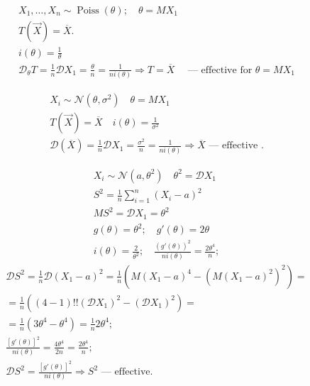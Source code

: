 \begin{example}
    \begin{gather*}
        X_1, \ldots, X_n \sim \operatorname{Poiss}(\theta); \quad 
        \theta = MX_1 \\
        T(\vec{X}) = \overline{X}. \\
        i(\theta) = \frac{1}{\theta} \\
        \mathcal{D}_{\theta} T = \frac{1}{n} \mathcal{D}X_1 =
        \frac{\theta}{n} = \frac{1}{ni(\theta)}
        \Rightarrow T = \overline{X} \quad \text{ --- effective for }
        \theta = MX_1
    \end{gather*}
\end{example}

\begin{example}
    \begin{gather*}
        X_i \sim \mathcal{N}(\theta, \sigma^2) \quad \theta = MX_1 \\
        T(\vec{X}) = \overline{X} \quad i(\theta) = \frac{1}{\sigma^2} \\
        \mathcal{D}(\overline{X}) = \frac{1}{n} \mathcal{D}X_1 = 
        \frac{\sigma^2}{n} = \frac{1}{ni(\theta)} \Rightarrow 
        \overline{X} \text{ --- effective }.
    \end{gather*}
\end{example}

\begin{example}
    \begin{gather*}
        X_i \sim \mathcal{N}(a, \theta^2) \quad \theta^2 = \mathcal{D}X_{1} \\
        S^2 = \frac{1}{n} \sum_{i=1}^{n} \left( X_i - a \right) ^2 \\
        MS^2 = \mathcal{D}X_{1} = \theta^2 \\
        g(\theta) = \theta^2; \quad g'(\theta) = 2 \theta \\
    i(\theta) = \frac{2}{\theta^2}; \quad
    \frac{\left( g'(\theta) \right) ^2}{ni(\theta)} =
    \frac{2 \theta^{4}}{n};
\end{gather*}
\begin{gather*}
    \mathcal{D}S^2 = \frac{1}{n} \mathcal{D}\left( X_1 - a \right) ^2 =
    \frac{1}{n}\left( M\left( X_1 - a \right) ^4 - 
    \left( M(X_1 - a)^2 \right) ^2\right) = \\
    = \frac{1}{n} \left( \left( 4-1 \right) !!
    \left( \mathcal{D}X_1 \right) ^2 -
    \left( \mathcal{D}X_1 \right)^2 \right) = \\
    = \frac{1}{n}\left( 3 \theta^4 - \theta^4 \right)  =
    \frac{1}{n} 2 \theta^{4}; \\
    \frac{\left[ g'(\theta) \right] ^2}{ni(\theta)} =
    \frac{4 \theta^{4}}{2n} = \frac{2 \theta^{4}}{n}; \\
    \mathcal{D}S^2 = \frac{\left[ g'(\theta) \right] ^2}{ni(\theta)}
    \Rightarrow S^2 \text{ --- effective}.
    \end{gather*}
\end{example}
